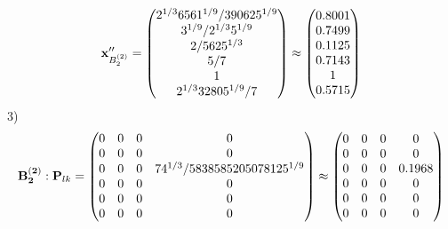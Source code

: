 \documentclass[10pt,a4paper]{article}
\begin{document}
	\[
		\bold{x}''_{B_2^{(2)}} = 
		\begin{pmatrix}
			{{2^ {1 / 3}}{6561^ {1 / 9}}} / {{390625^ {1 / 9}}} \\
			{{3^ {1 / 9}}} / {{2^ {1 / 3}}{5^ {1 / 9}}} \\
			{{2}} / {{5625^ {1 / 3}}} \\
			{{5}} / {{7}} \\
			{1}{} \\
			{{2^ {1 / 3}}{32805^ {1 / 9}}} / {{7}} \\
		\end{pmatrix}
		\approx
		\begin{pmatrix}
			0.8001   \\
			0.7499   \\
			0.1125   \\
			0.7143   \\
			1        \\
			0.5715   \\
		\end{pmatrix}
	\]
	3)
	\[
		\bold{B_2^{(2)}}: \bold{P}_{lk} = 
		\begin{pmatrix}
			{{0}}{} & {{0}}{} & {{0}}{} & {{0}}{} \\
			{{0}}{} & {{0}}{} & {{0}}{} & {{0}}{} \\
			{{0}}{} & {{0}}{} & {{0}}{} & {{7}{4^ {1 / 3}}} / {{5838585205078125^ {1 / 9}}} \\
			{{0}}{} & {{0}}{} & {{0}}{} & {{0}}{} \\
			{{0}}{} & {{0}}{} & {{0}}{} & {{0}}{} \\
			{{0}}{} & {{0}}{} & {{0}}{} & {{0}}{} \\
		\end{pmatrix}
		\approx
		\begin{pmatrix}
			0        & 0        & 0        & 0        \\
			0        & 0        & 0        & 0        \\
			0        & 0        & 0        & 0.1968   \\
			0        & 0        & 0        & 0        \\
			0        & 0        & 0        & 0        \\
			0        & 0        & 0        & 0        \\
		\end{pmatrix}
	\]
\end{document}
